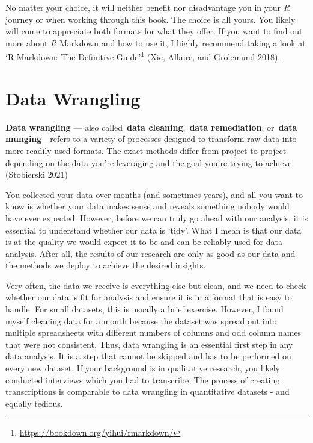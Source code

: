 \documentclass[
  letterpaper,
]{krantz}
\renewenvironment{quote}{\begin{VF}}{\end{VF}}
\renewcommand{\href}[2]{#2\footnote{\url{#1}}}
\begin{document}
No matter your choice, it will neither benefit nor disadvantage you in
your \emph{R} journey or when working through this book. The choice is
all yours. You likely will come to appreciate both formats for what they
offer. If you want to find out more about \emph{R} Markdown and how to
use it, I highly recommend taking a look at
\href{https://bookdown.org/yihui/rmarkdown/}{`R Markdown: The Definitive
Guide'} (Xie, Allaire, and Grolemund 2018).


\chapter{Data Wrangling}\label{sec-data-wrangling}

\begin{quote}
\textbf{Data wrangling} --- also called~\textbf{data
cleaning},~\textbf{data remediation}, or~\textbf{data munging}---refers
to a variety of processes designed to transform raw data into more
readily used formats. The exact methods differ from project to project
depending on the data you're leveraging and the goal you're trying to
achieve. (Stobierski 2021)
\end{quote}

You collected your data over months (and sometimes years), and all you
want to know is whether your data makes sense and reveals something
nobody would have ever expected. However, before we can truly go ahead
with our analysis, it is essential to understand whether our data is
`tidy'. What I mean is that our data is at the quality we would expect
it to be and can be reliably used for data analysis. After all, the
results of our research are only as good as our data and the methods we
deploy to achieve the desired insights.

Very often, the data we receive is everything else but clean, and we
need to check whether our data is fit for analysis and ensure it is in a
format that is easy to handle. For small datasets, this is usually a
brief exercise. However, I found myself cleaning data for a month
because the dataset was spread out into multiple spreadsheets with
different numbers of columns and odd column names that were not
consistent. Thus, data wrangling is an essential first step in any data
analysis. It is a step that cannot be skipped and has to be performed on
every new dataset. If your background is in qualitative research, you
likely conducted interviews which you had to transcribe. The process of
creating transcriptions is comparable to data wrangling in quantitative
datasets - and equally tedious.
\end{document}
